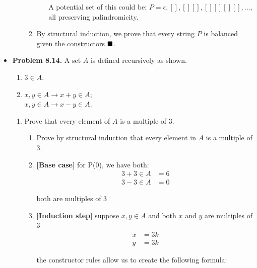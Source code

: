 \documentclass{article}
\begin{document}
\begin{itemize}
\begin{enumerate}[label=(d)]
\begin{enumerate}[label=\roman*.]
\begin{enumerate}[label=\arabic*.]
                    A potential set of this could be:
                    $P = {\epsilon, [], [][], [][][][], ...}$, all preserving palindromicity.
                \end{enumerate}
                \item By structural induction, we prove that every string $P$ is balanced given the constructors $\hfill\blacksquare$.
            \end{enumerate}
        \end{enumerate}
        \item \textbf{Problem 8.14.} A set $A$ is defined recursively as shown.
        \begin{enumerate}[label=\arabic*.]
            \item $3 \in A$.
            \item $x,y \in A \rightarrow x + y \in A$;\\
            $x,y \in A \rightarrow x-y \in A$.
        \end{enumerate}
        \begin{enumerate}[label=(\alph*)]
            \item Prove that every element of $A$ is a multiple of 3.
            \begin{enumerate}[label=\arabic*.]
                \item Prove by structural induction that every element in $A$ is a multiple of $3$.
                \item \textbf{[Base case]} for P(0), we have both:
                \begin{align*}
                    3 + 3 \in A &= 6\\
                    3 - 3 \in A &= 0
                \end{align*}
                \begin{center}
                    both are multiples of 3
                \end{center}
                \item \textbf{[Induction step]} suppose $x, y \in A$ and both $x$ and $y$ are multiples of 3
                \begin{align*}
                    x &= 3k\\
                    y &= 3k
                \end{align*}
                \begin{center}
                    the constructor rules allow us to create the following formula:
                \end{center}

\end{enumerate}
\end{enumerate}
\end{itemize}
\end{document}

